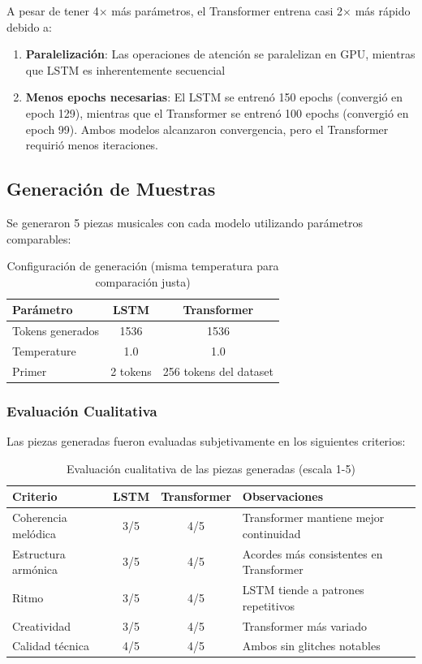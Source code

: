 \documentclass[12pt,a4paper]{article}
\begin{document}
A pesar de tener 4$\times$ más parámetros, el Transformer entrena casi 2$\times$ más rápido debido a:
\begin{enumerate}
    \item \textbf{Paralelización}: Las operaciones de atención se paralelizan en GPU, mientras que LSTM es inherentemente secuencial
    \item \textbf{Menos epochs necesarias}: El LSTM se entrenó 150 epochs (convergió en epoch 129), mientras que el Transformer se entrenó 100 epochs (convergió en epoch 99). Ambos modelos alcanzaron convergencia, pero el Transformer requirió menos iteraciones.
\end{enumerate}

\subsection{Generación de Muestras}

Se generaron 5 piezas musicales con cada modelo utilizando parámetros comparables:

\begin{table}[H]
\centering
\begin{tabular}{lcc}
\toprule
\textbf{Parámetro} & \textbf{LSTM} & \textbf{Transformer} \\
\midrule
Tokens generados & 1536 & 1536 \\
Temperature & 1.0 & 1.0 \\
Primer & 2 tokens & 256 tokens del dataset \\
\bottomrule
\end{tabular}
\caption{Configuración de generación (misma temperatura para comparación justa)}
\end{table}

\subsubsection{Evaluación Cualitativa}
Las piezas generadas fueron evaluadas subjetivamente en los siguientes criterios:

\begin{table}[H]
\centering
\begin{tabular}{lccp{5cm}}
\toprule
\textbf{Criterio} & \textbf{LSTM} & \textbf{Transformer} & \textbf{Observaciones} \\
\midrule
Coherencia melódica & 3/5 & 4/5 & Transformer mantiene mejor continuidad \\
Estructura armónica & 3/5 & 4/5 & Acordes más consistentes en Transformer \\
Ritmo & 3/5 & 4/5 & LSTM tiende a patrones repetitivos \\
Creatividad & 3/5 & 4/5 & Transformer más variado \\
Calidad técnica & 4/5 & 4/5 & Ambos sin glitches notables \\
\bottomrule
\end{tabular}
\caption{Evaluación cualitativa de las piezas generadas (escala 1-5)}
\end{table}
\end{document}
